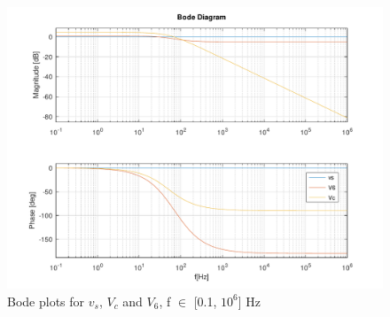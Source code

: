 \begin{figure}[h] \centering
\includegraphics[width=0.95\linewidth]{../mat/t2-t6.pdf}
\caption{Bode plots for $v_s$, $V_c$ and $V_6$, f $\in$ [0.1, $10^6$] Hz}
\label{cfergter}
\end{figure}
